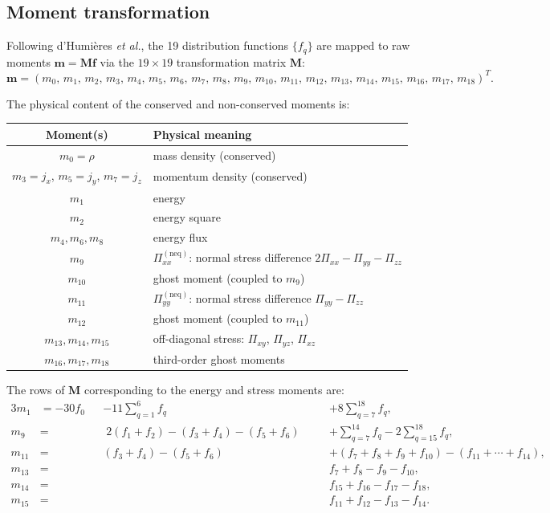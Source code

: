 \documentclass[11pt,a4paper]{article}
\newcommand{\vect}[1]{\bm{#1}}
\newcommand{\tens}[1]{\bm{#1}}
\begin{document}
\subsection{Moment transformation}

Following d'Humi\`eres \textit{et al.}, the 19 distribution functions
$\{f_q\}$ are mapped to raw moments $\vect{m}=\tens{M}\vect{f}$
via the $19\times 19$ transformation matrix $\tens{M}$:
\begin{equation}
  \vect{m} = (m_0,\,m_1,\,m_2,\,m_3,\,m_4,\,m_5,\,m_6,\,m_7,\,m_8,%
  \,m_9,\,m_{10},\,m_{11},\,m_{12},\,m_{13},\,m_{14},\,m_{15},%
  \,m_{16},\,m_{17},\,m_{18})^T .
\end{equation}

The physical content of the conserved and non-conserved moments is:
\begin{center}
\begin{tabular}{cl}
  \toprule
  Moment(s) & Physical meaning \\
  \midrule
  $m_0 = \rho$ & mass density (conserved) \\
  $m_3 = j_x$, $m_5 = j_y$, $m_7 = j_z$ & momentum density (conserved) \\
  $m_1$ & energy \\
  $m_2$ & energy square \\
  $m_4,m_6,m_8$ & energy flux \\
  $m_9$ & $\Pi_{xx}^{(\text{neq})}$: normal stress difference $2\Pi_{xx}-\Pi_{yy}-\Pi_{zz}$ \\
  $m_{10}$ & ghost moment (coupled to $m_9$) \\
  $m_{11}$ & $\Pi_{yy}^{(\text{neq})}$: normal stress difference $\Pi_{yy}-\Pi_{zz}$ \\
  $m_{12}$ & ghost moment (coupled to $m_{11}$) \\
  $m_{13},m_{14},m_{15}$ & off-diagonal stress: $\Pi_{xy}$, $\Pi_{yz}$, $\Pi_{xz}$ \\
  $m_{16},m_{17},m_{18}$ & third-order ghost moments \\
  \bottomrule
\end{tabular}
\end{center}

The rows of $\tens{M}$ corresponding to the energy and stress moments
are:
\begin{alignat}{3}
  m_1   &= -30 f_0 &&- 11\!\sum_{q=1}^{6} f_q &&+ 8\!\sum_{q=7}^{18} f_q ,
  \label{eq:m1def}\\[4pt]
  m_9   &= &&\; 2(f_1+f_2) - (f_3+f_4) - (f_5+f_6) &\quad&
  + \sum_{q=7}^{14}f_q - 2\!\sum_{q=15}^{18}f_q ,
  \label{eq:m9def}\\[4pt]
  m_{11} &= && (f_3+f_4) - (f_5+f_6) &&
  + (f_7+f_8+f_9+f_{10}) - (f_{11}+\cdots+f_{14}) ,\\[4pt]
  m_{13} &= && && f_7 + f_8 - f_9 - f_{10} ,\\
  m_{14} &= && && f_{15}+f_{16} - f_{17}-f_{18} ,\\
  m_{15} &= && && f_{11}+f_{12} - f_{13}-f_{14} .
\end{alignat}
\end{document}
